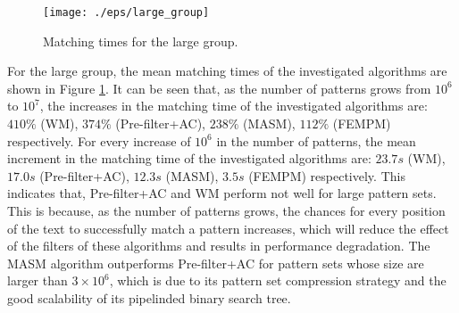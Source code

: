\begin{figure}[htbp]
  \centering
  \texttt{[image: ./eps/large\_group]}
  \caption{Matching times for the large group.}
  \label{fig:large_group}
\end{figure}

For the large group, the mean matching times of the investigated
algorithms are shown in Figure \ref{fig:large_group}. It can be seen
that, as the number of patterns grows from $10^6$ to $10^7$, the
increases in the matching time of the investigated algorithms are:
$410\%$ (\textsf{WM}), $374\%$ (\textsf{Pre-filter+AC}), $238\%$
(\textsf{MASM}), $112\%$ (\textsf{FEMPM}) respectively. For every
increase of $10^6$ in the number of patterns, the mean increment in
the matching time of the investigated algorithms are: $23.7s$
(\textsf{WM}), $17.0s$ (\textsf{Pre-filter+AC}), $12.3s$
(\textsf{MASM}), $3.5s$ (\textsf{FEMPM}) respectively. This indicates
that, \textsf{Pre-filter+AC} and \textsf{WM} perform not well for
large pattern sets. This is because, as the number of patterns grows,
the chances for every position of the text to successfully match a
pattern increases, which will reduce the effect of the filters of
these algorithms and results in performance degradation. The
\textsf{MASM} algorithm outperforms \textsf{Pre-filter+AC} for pattern
sets whose size are larger than $3 \times 10^6$, which is due to its
pattern set compression strategy and the good scalability of its
pipelinded binary search tree.

